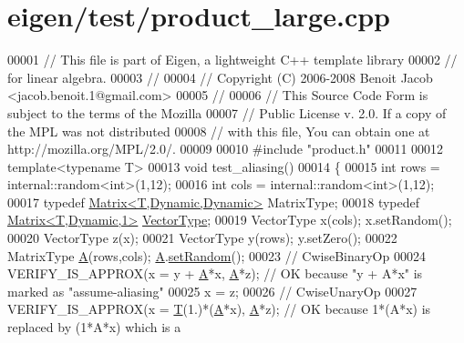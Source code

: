 \hypertarget{eigen_2test_2product__large_8cpp_source}{}\section{eigen/test/product\+\_\+large.cpp}
\label{eigen_2test_2product__large_8cpp_source}

\begin{DoxyCode}
00001 \textcolor{comment}{// This file is part of Eigen, a lightweight C++ template library}
00002 \textcolor{comment}{// for linear algebra.}
00003 \textcolor{comment}{//}
00004 \textcolor{comment}{// Copyright (C) 2006-2008 Benoit Jacob <jacob.benoit.1@gmail.com>}
00005 \textcolor{comment}{//}
00006 \textcolor{comment}{// This Source Code Form is subject to the terms of the Mozilla}
00007 \textcolor{comment}{// Public License v. 2.0. If a copy of the MPL was not distributed}
00008 \textcolor{comment}{// with this file, You can obtain one at http://mozilla.org/MPL/2.0/.}
00009 
00010 \textcolor{preprocessor}{#include "product.h"}
00011 
00012 \textcolor{keyword}{template}<\textcolor{keyword}{typename} T>
00013 \textcolor{keywordtype}{void} test\_aliasing()
00014 \{
00015   \textcolor{keywordtype}{int} rows = internal::random<int>(1,12);
00016   \textcolor{keywordtype}{int} cols = internal::random<int>(1,12);
00017   \textcolor{keyword}{typedef} \hyperlink{group___core___module_class_eigen_1_1_matrix}{Matrix<T,Dynamic,Dynamic>} MatrixType;
00018   \textcolor{keyword}{typedef} \hyperlink{group___core___module_class_eigen_1_1_matrix}{Matrix<T,Dynamic,1>} \hyperlink{struct_vector_type}{VectorType};
00019   VectorType x(cols); x.setRandom();
00020   VectorType z(x);
00021   VectorType y(rows); y.setZero();
00022   MatrixType \hyperlink{group___core___module_class_eigen_1_1_matrix}{A}(rows,cols); \hyperlink{group___core___module_class_eigen_1_1_matrix}{A}.\hyperlink{class_eigen_1_1_plain_object_base_af0e576a0e1aefc9ee346de44cc352ba3}{setRandom}();
00023   \textcolor{comment}{// CwiseBinaryOp}
00024   VERIFY\_IS\_APPROX(x = y + \hyperlink{group___core___module_class_eigen_1_1_matrix}{A}*x, \hyperlink{group___core___module_class_eigen_1_1_matrix}{A}*z);     \textcolor{comment}{// OK because "y + A*x" is marked as "assume-aliasing"}
00025   x = z;
00026   \textcolor{comment}{// CwiseUnaryOp}
00027   VERIFY\_IS\_APPROX(x = \hyperlink{group___sparse_core___module}{T}(1.)*(\hyperlink{group___core___module_class_eigen_1_1_matrix}{A}*x), \hyperlink{group___core___module_class_eigen_1_1_matrix}{A}*z); \textcolor{comment}{// OK because 1*(A*x) is replaced by (1*A*x) which is a
}
\end{DoxyCode}
